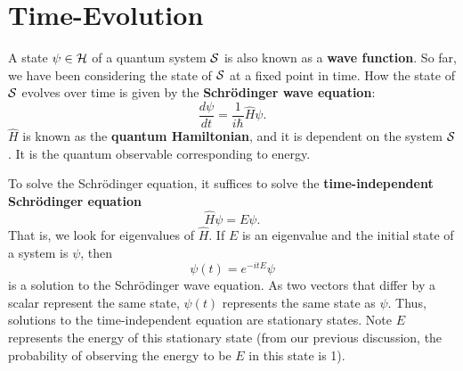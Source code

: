 \section{Time-Evolution}
A state $\psi \in {\mathcal H}$ of a quantum system ${\mathcal S}$ is also known as a \textbf{wave function}. So far, we have been considering the state of ${\mathcal S}$ at a fixed point in time. How the state of ${\mathcal S}$ evolves over time is given by the \textbf{Schr\"{o}dinger wave equation}:
\[
    \frac{d\psi}{dt} = \frac{1}{i\hbar}\hat{H}\psi.
\]
$\hat{H}$ is known as the \textbf{quantum Hamiltonian}, and it is dependent on the system ${\mathcal S}$. It is the quantum observable corresponding to energy.

To solve the Schr\"{o}dinger equation, it suffices to solve the \textbf{time-independent Schr\"{o}dinger equation}
\[
    \hat{H}\psi = E\psi.
\]
That is, we look for eigenvalues of $\hat{H}$. If $E$ is an eigenvalue and the initial state of a system is $\psi$, then
\[
    \psi(t) = e^{-itE}\psi
\]
is a solution to the Schr\"{o}dinger wave equation. As two vectors that differ by a scalar represent the same state, $\psi(t)$ represents the same state as $\psi$. Thus, solutions to the time-independent equation are stationary states. Note $E$ represents the energy of this stationary state (from our previous discussion, the probability of observing the energy to be $E$ in this state is 1).